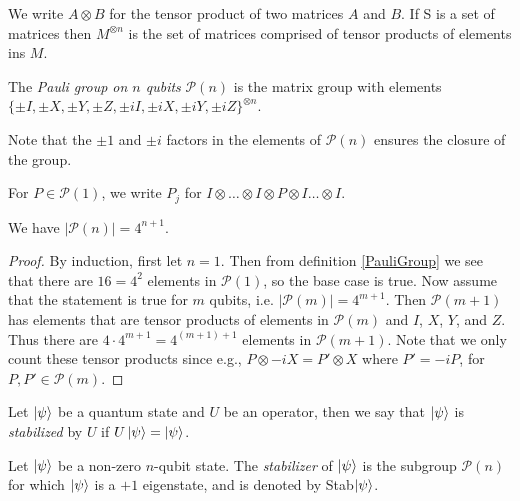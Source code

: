 \documentclass[12pt]{dalthesis}
\begin{document}
We write $A \otimes B$ for the tensor product of two matrices $A$ and $B$. If S is a set of matrices then $M^{\otimes n}$ is the set of matrices comprised of tensor products of elements ins $M$.

\begin{definition}
\label{PauliGroup}
The \emph{Pauli group on $n$ qubits} $\mathcal{P}(n)$ is the matrix group with elements $\{ \pm I, \pm X, \pm Y, \pm Z, \pm iI, \pm iX, \pm iY, \pm iZ \}^{\otimes n}$.
\end{definition}

Note that the $\pm 1$ and $\pm i$ factors in the elements of $\mathcal{P}(n)$ ensures the closure of the group.

\begin{definition}
For $P \in \mathcal{P}(1)$, we write $P_j$ for $I \otimes \dots \otimes I \otimes P \otimes I \dots \otimes I$.
\end{definition}

\begin{proposition}
We have $|\mathcal{P}(n)|=4^{n+1}$.
\end{proposition}

\begin{proof}
By induction, first let $n=1$. Then from definition \ref{PauliGroup} we see that there are $16 = 4^2$ elements in $\mathcal{P}(1)$, so the base case is true. Now assume that the statement is true for $m$ qubits, i.e. $|\mathcal{P}(m)| = 4^{m+1}$. Then $\mathcal{P}(m+1)$ has elements that are tensor products of elements in $\mathcal{P}(m)$ and $I$, $X$, $Y$, and $Z$. Thus there are $4 \cdot 4^{m+1} = 4^{(m+1)+1}$ elements in $\mathcal{P}(m+1)$. Note that we only count these tensor products since e.g., $P \otimes -iX = P' \otimes X$ where $P' = -iP$, for $P, P' \in \mathcal{P}(m)$.
\end{proof}

\begin{definition}
Let $\ket{\psi}$ be a quantum state and $U$ be an operator, then we say that $\ket{\psi}$ is \emph{stabilized} by $U$ if $U\ket{\psi} = \ket{\psi}$. 
\end{definition}

\begin{definition}[Stabilizer]
Let $\ket{\psi}$ be a non-zero $n$-qubit state. The \emph{stabilizer} of $\ket{\psi}$ is the subgroup $\mathcal{P}(n)$ for which $\ket{\psi}$ is a $+1$ eigenstate, and is denoted by Stab$\ket{\psi}$. 
\end{definition}
\end{document}
